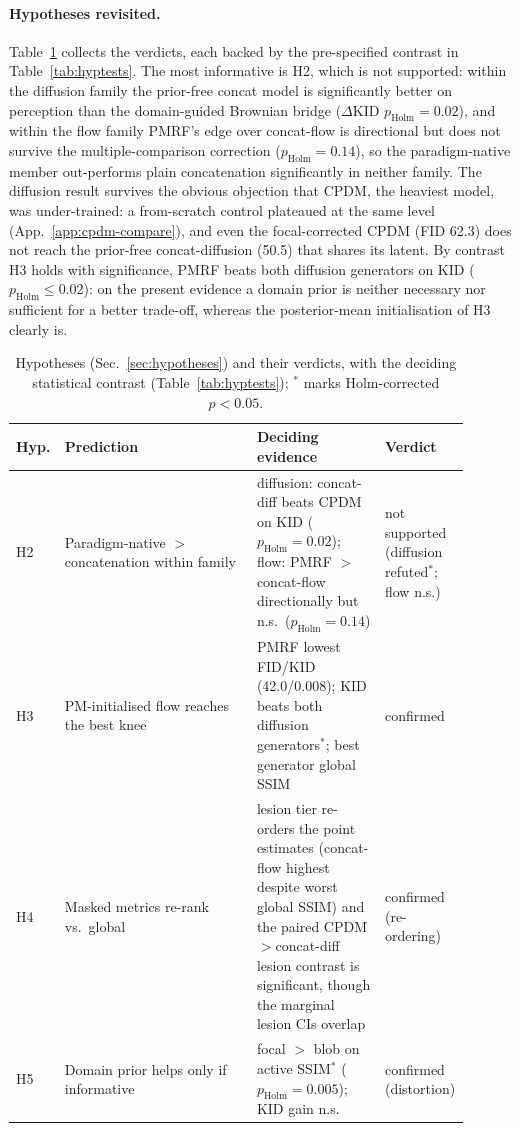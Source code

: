 \documentclass[11pt,a4paper]{article}
\newcommand{\num}[1]{#1}
\begin{document}
\paragraph{Hypotheses revisited.} Table~\ref{tab:hypotheses} collects the verdicts, each backed
by the pre-specified contrast in Table~\ref{tab:hyptests}. The most informative is H2,
which is not supported: within the diffusion family the prior-free concat model is
significantly better on perception than the domain-guided Brownian bridge
($\Delta$KID $p_{\text{Holm}}\!=\!0.02$), and within the flow family PMRF's edge over concat-flow
is directional but does not survive the multiple-comparison correction
($p_{\text{Holm}}\!=\!0.14$), so the paradigm-native member out-performs plain concatenation
significantly in neither family. The diffusion result survives the obvious objection that CPDM, the heaviest
model, was under-trained: a from-scratch control plateaued at the same level
(App.~\ref{app:cpdm-compare}), and even the focal-corrected CPDM (FID \num{62.3}) does not reach
the prior-free concat-diffusion (\num{50.5}) that shares its latent. By contrast H3
holds with significance, PMRF beats both diffusion generators on KID
($p_{\text{Holm}}\!\le\!0.02$): on the present evidence a domain prior is neither necessary nor
sufficient for a better trade-off, whereas the posterior-mean initialisation of H3 clearly is.

\begin{table}[h]\centering\small
\caption{Hypotheses (Sec.~\ref{sec:hypotheses}) and their verdicts, with the deciding statistical
contrast (Table~\ref{tab:hyptests}); $^*$ marks Holm-corrected $p<0.05$.}
\label{tab:hypotheses}
\begin{tabular}{p{0.08\linewidth} p{0.42\linewidth} p{0.28\linewidth} p{0.12\linewidth}}
\toprule
Hyp. & Prediction & Deciding evidence & Verdict \\
\midrule
H2 & Paradigm-native $>$ concatenation within family & diffusion: concat-diff beats CPDM on KID ($p_{\text{Holm}}\!=\!0.02$); flow: PMRF $>$ concat-flow directionally but n.s.\ ($p_{\text{Holm}}\!=\!0.14$) & not supported (diffusion refuted$^*$; flow n.s.) \\
H3 & PM-initialised flow reaches the best knee & PMRF lowest FID/KID (\num{42.0}/\num{0.008}); KID beats both diffusion generators$^*$; best generator global SSIM & confirmed \\
H4 & Masked metrics re-rank vs.\ global & lesion tier re-orders the point estimates (concat-flow highest despite worst global SSIM) and the paired CPDM$>$concat-diff lesion contrast is significant, though the marginal lesion CIs overlap & confirmed (re-ordering) \\
H5 & Domain prior helps only if informative & focal $>$ blob on active SSIM$^*$ ($p_{\text{Holm}}\!=\!0.005$); KID gain n.s. & confirmed (distortion) \\
\bottomrule
\end{tabular}
\end{table}
\end{document}
